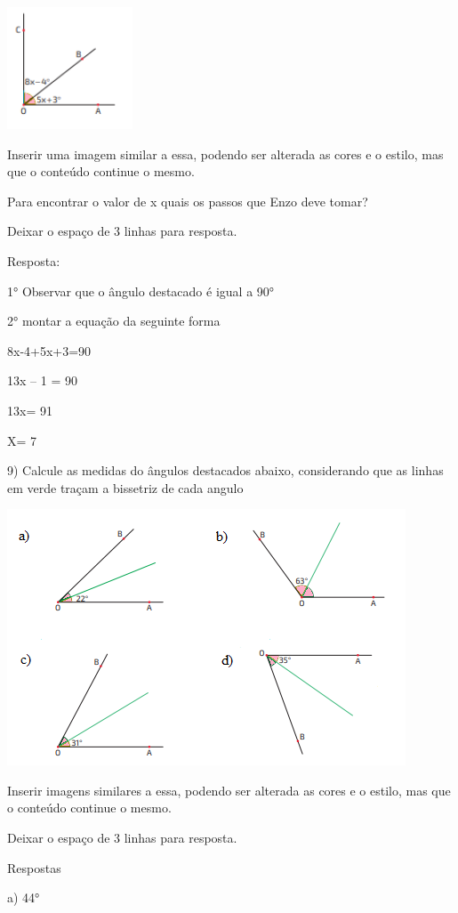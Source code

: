 {\includegraphics[width=1.47134in,height=1.42708in]{./imgSAEB_8_MAT/media/image31.png}

Inserir uma imagem similar a essa, podendo ser alterada as cores e o
estilo, mas que o conteúdo continue o mesmo.

Para encontrar o valor de x quais os passos que Enzo deve tomar?

Deixar o espaço de 3 linhas para resposta.

Resposta:

1° Observar que o ângulo destacado é igual a 90°

2° montar a equação da seguinte forma

8x-4+5x+3=90

13x -- 1 = 90

13x= 91

X= 7

9) Calcule as medidas do ângulos destacados abaixo, considerando que as
linhas em verde traçam a bissetriz de cada angulo

\includegraphics[width=4.66667in,height=3in]{./imgSAEB_8_MAT/media/image32.png}

Inserir imagens similares a essa, podendo ser alterada as cores e o
estilo, mas que o conteúdo continue o mesmo.

Deixar o espaço de 3 linhas para resposta.

Respostas

a) 44°

}
